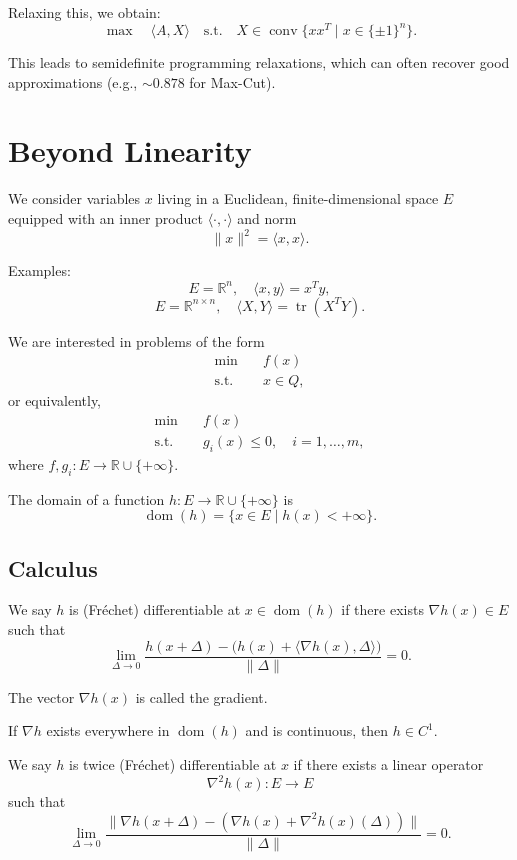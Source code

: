 \documentclass[12pt,oneside]{book}
\numberwithin{equation}{section}
\theoremstyle{definition}
\theoremstyle{plain}
\theoremstyle{remark}
\begin{document}
Relaxing this, we obtain:
\[
\max \quad \langle A, X \rangle
\quad \text{s.t.} \quad X \in \operatorname{conv}\{ x x^T \mid x \in \{\pm 1\}^n \}.
\]

This leads to semidefinite programming relaxations, which can often recover good approximations (e.g., $\sim 0.878$ for Max-Cut).

\chapter{Beyond Linearity}

We consider variables $x$ living in a Euclidean, finite-dimensional space $E$ equipped with an inner product $\langle \cdot,\cdot \rangle$ and norm
\[
\|x\|^2 = \langle x,x \rangle.
\]

Examples:
\[
E = \mathbb{R}^n, \quad \langle x,y \rangle = x^T y,
\]
\[
E = \mathbb{R}^{n \times n}, \quad \langle X,Y \rangle = \operatorname{tr}(X^T Y).
\]

We are interested in problems of the form
\[
\begin{aligned}
\min \quad & f(x) \\
\text{s.t.} \quad & x \in Q,
\end{aligned}
\]
or equivalently,
\[
\begin{aligned}
\min \quad & f(x) \\
\text{s.t.} \quad & g_i(x) \le 0, \quad i = 1,\dots,m,
\end{aligned}
\]
where $f,g_i : E \to \mathbb{R} \cup \{+\infty\}$.

The domain of a function $h : E \to \mathbb{R} \cup \{+\infty\}$ is
\[
\operatorname{dom}(h) = \{ x \in E \mid h(x) < +\infty \}.
\]

\section{Calculus}

We say $h$ is (Fréchet) differentiable at $x \in \operatorname{dom}(h)$ if there exists $\nabla h(x) \in E$ such that
\[
\lim_{\Delta \to 0}
\frac{h(x+\Delta) - \big(h(x) + \langle \nabla h(x), \Delta \rangle \big)}{\|\Delta\|} = 0.
\]

The vector $\nabla h(x)$ is called the gradient.

If $\nabla h$ exists everywhere in $\operatorname{dom}(h)$ and is continuous, then $h \in C^1$.

We say $h$ is twice (Fréchet) differentiable at $x$ if there exists a linear operator
\[
\nabla^2 h(x) : E \to E
\]
such that
\[
\lim_{\Delta \to 0}
\frac{\|\nabla h(x+\Delta) - (\nabla h(x) + \nabla^2 h(x)(\Delta))\|}{\|\Delta\|} = 0.
\]
\end{document}
